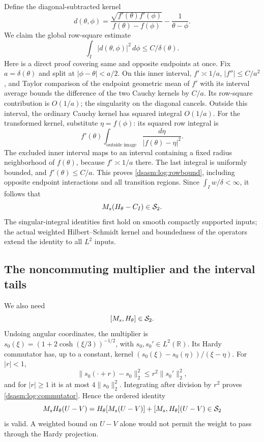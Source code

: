 \documentclass[11pt,letterpaper]{article}
\theoremstyle{remark}\newtheorem{remark}[theorem]{Remark}
\newcommand{\R}{\mathbb R}\newcommand{\C}{\mathbb C}\newcommand{\N}{\mathbb N}
\begin{document}
Define the diagonal-subtracted kernel
\[
 d(\theta,\phi)=
 \frac{\sqrt{f'(\theta)f'(\phi)}}{f(\theta)-f(\phi)}
             -\frac1{\theta-\phi}.
\]
We claim the global row-square estimate
\begin{equation}\label{dsasm:log:rowbound}
 \int_I|d(\theta,\phi)|^2\,d\phi\le C/\delta(\theta).
\end{equation}
Here is a direct proof covering same and opposite endpoints at once.
Fix $a=\delta(\theta)$ and split at $|\phi-\theta|<a/2$.
On this inner interval, $f'\asymp1/a$, $|f''|\le C/a^2$, and
Taylor comparison of the endpoint geometric mean of $f'$ with its
interval average bounds the difference of the two Cauchy kernels by
$C/a$. Its row-square contribution is $O(1/a)$; the singularity on
the diagonal cancels.
Outside this interval, the ordinary Cauchy kernel has squared integral
$O(1/a)$. For the transformed kernel, substitute $\eta=f(\phi)$:
its squared row integral is
\[
 f'(\theta)\int_{\text{outside image}}
                \frac{d\eta}{|f(\theta)-\eta|^2}.
\]
The excluded inner interval maps to an interval containing a fixed
radius neighborhood of $f(\theta)$, because $f'\asymp1/a$ there.
The last integral is uniformly bounded, and $f'(\theta)\le C/a$.
This proves \eqref{dsasm:log:rowbound}, including opposite endpoint interactions
and all transition regions.
Since $\int_I w/\delta<\infty$, it follows that
\begin{equation}\label{dsasm:log:coordHS}
 M_s(H_\theta-C_I)\in\mathcal S_2.
\end{equation}
The singular-integral identities first hold on smooth compactly
supported inputs; the actual weighted Hilbert--Schmidt kernel and
boundedness of the operators extend the identity to all $L^2$ inputs.

\subsection{The noncommuting multiplier and the interval tails}
We also need
\begin{equation}\label{dsasm:log:commutator}
 [M_s,H_\theta]\in\mathcal S_2.
\end{equation}
Undoing angular coordinates, the multiplier is
$s_0(\xi)=(1+2\cosh(\xi/3))^{-1/2}$, with $s_0,s_0'\in L^2(\R)$.
Its Hardy commutator has, up to a constant, kernel
$(s_0(\xi)-s_0(\eta))/(\xi-\eta)$. For $|r|<1$,
\[
 \|s_0(\cdot+r)-s_0\|_2^2\le r^2\|s_0'\|_2^2,
\]
and for $|r|\ge1$ it is at most $4\|s_0\|_2^2$. Integrating after
division by $r^2$ proves \eqref{dsasm:log:commutator}. Hence the ordered identity
\begin{equation}\label{dsasm:log:orderedcommutator}
 M_sH_\theta(U-V)
 =H_\theta[M_s(U-V)]+[M_s,H_\theta](U-V)\in\mathcal S_2
\end{equation}
is valid. A weighted bound on $U-V$ alone would not permit the weight
to pass through the Hardy projection.
\end{document}
